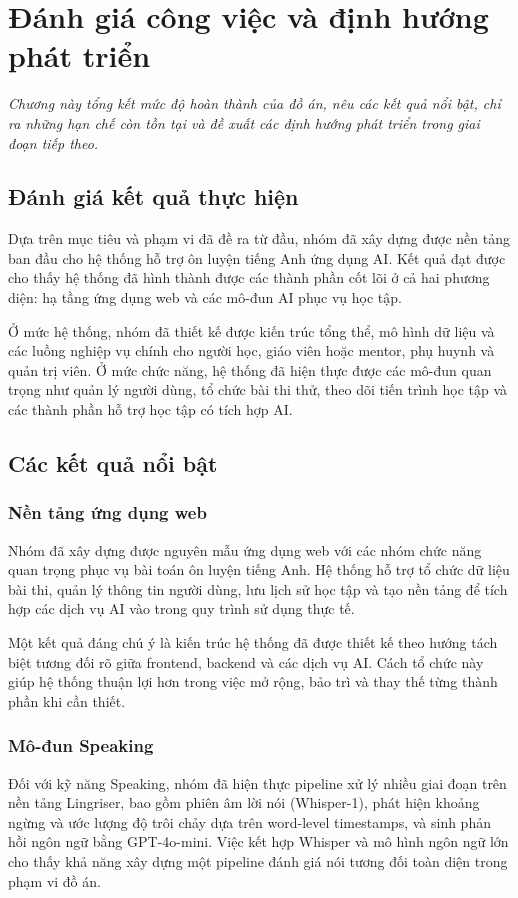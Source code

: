\chapter{Đánh giá công việc và định hướng phát triển}
\textit{Chương này tổng kết mức độ hoàn thành của đồ án, nêu các kết quả nổi bật, chỉ ra những hạn chế còn tồn tại và đề xuất các định hướng phát triển trong giai đoạn tiếp theo.}

\section{Đánh giá kết quả thực hiện}
Dựa trên mục tiêu và phạm vi đã đề ra từ đầu, nhóm đã xây dựng được nền tảng ban đầu cho hệ thống hỗ trợ ôn luyện tiếng Anh ứng dụng AI. Kết quả đạt được cho thấy hệ thống đã hình thành được các thành phần cốt lõi ở cả hai phương diện: hạ tầng ứng dụng web và các mô-đun AI phục vụ học tập.

Ở mức hệ thống, nhóm đã thiết kế được kiến trúc tổng thể, mô hình dữ liệu và các luồng nghiệp vụ chính cho người học, giáo viên hoặc mentor, phụ huynh và quản trị viên. Ở mức chức năng, hệ thống đã hiện thực được các mô-đun quan trọng như quản lý người dùng, tổ chức bài thi thử, theo dõi tiến trình học tập và các thành phần hỗ trợ học tập có tích hợp AI.

\section{Các kết quả nổi bật}
\subsection{Nền tảng ứng dụng web}
Nhóm đã xây dựng được nguyên mẫu ứng dụng web với các nhóm chức năng quan trọng phục vụ bài toán ôn luyện tiếng Anh. Hệ thống hỗ trợ tổ chức dữ liệu bài thi, quản lý thông tin người dùng, lưu lịch sử học tập và tạo nền tảng để tích hợp các dịch vụ AI vào trong quy trình sử dụng thực tế.

Một kết quả đáng chú ý là kiến trúc hệ thống đã được thiết kế theo hướng tách biệt tương đối rõ giữa frontend, backend và các dịch vụ AI. Cách tổ chức này giúp hệ thống thuận lợi hơn trong việc mở rộng, bảo trì và thay thế từng thành phần khi cần thiết.

\subsection{Mô-đun Speaking}
Đối với kỹ năng Speaking, nhóm đã hiện thực pipeline xử lý nhiều giai đoạn
trên nền tảng Lingriser, bao gồm phiên âm lời nói (Whisper-1), phát hiện
khoảng ngừng và ước lượng độ trôi chảy dựa trên word-level timestamps, và
sinh phản hồi ngôn ngữ bằng GPT-4o-mini. Việc kết hợp Whisper và mô hình
ngôn ngữ lớn cho thấy khả năng xây dựng một pipeline đánh giá nói tương đối
toàn diện trong phạm vi đồ án.

